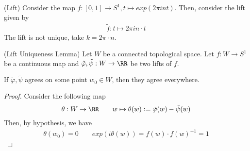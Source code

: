 \documentclass[Total.tex]{subfiles}
\begin{document}
\begin{itemize}
		\begin{example}
			(Lift) Consider the map $f:[0,1]\rightarrow S^1,t\mapsto exp(2\pi int)$. Then, consider the lift given by
			\begin{gather*}
				\tilde{f}:t\mapsto 2\pi in\cdot t
			\end{gather*}
			The lift is not unique, take $k=2\pi\cdot n$.
		\end{example}
		
		\begin{lemma}
			(Lift Uniqueness Lemma) Let $W$ be a connected topological space. Let $f:W\rightarrow S^1$ be a continuous map and $\tilde{\varphi},\tilde{\psi}:W\rightarrow \RR$ be two lifts of $f$.
			
			If $\tilde{\varphi},\tilde{\psi}$ agrees on some point $w_0\in W$, then they agree everywhere. 
		\end{lemma}
		\begin{proof}
			Consider the following map
			\begin{gather*}
				\theta:W\rightarrow \RR\qquad w\mapsto \theta(w):=\tilde{\varphi}(w)-\tilde{\psi}(w)
			\end{gather*}
			Then, by hypothesis, we have
			\begin{gather*}
				\theta(w_0)=0\qquad exp(i\theta(w))=f(w)\cdot f(w)^{-1}=1
			\end{gather*}
			

\end{proof}
\end{itemize}
\end{document}
